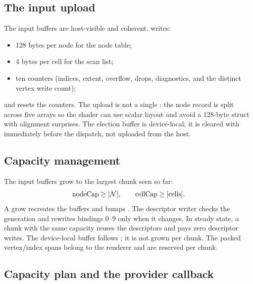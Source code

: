 \subsection{The input upload}

The input buffers are host-visible and coherent.   writes:
\begin{itemize}
\item 128 bytes per node for the node table;
\item 4 bytes per cell for the scan list;
\item ten counters (indices, extent, overflow, drops, diagnostics, and the
  distinct vertex write count);
\end{itemize}
and resets the counters.  The upload is not a single : the
node record is split across five arrays so the shader can use scalar
layout and avoid a 128-byte struct with alignment surprises.  The
 election buffer is device-local; it is cleared with
 immediately before the dispatch, not uploaded from
the host.

\subsection{Capacity management}

The input buffers grow to the largest chunk seen so far:
\begin{equation}
  \text{nodeCap}\ge |\mathcal{N}|,\qquad
  \text{cellCap}\ge |\text{cells}|.
\end{equation}
A grow recreates the buffers and bumps .  The
descriptor writer checks the generation and rewrites bindings 0--9 only
when it changes.  In steady state, a chunk with the same capacity reuses
the descriptors and pays zero descriptor writes.  The device-local
 buffer follows ; it is not grown per chunk.
The packed vertex/index spans belong to the renderer and are reserved per
chunk.

\subsection{Capacity plan and the provider callback}

